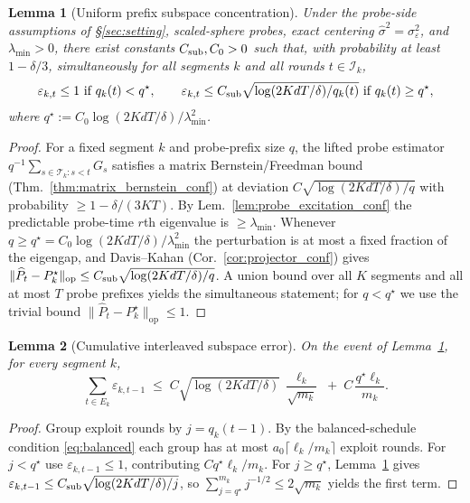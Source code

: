 \documentclass{article}
\newcommand{\op}{\mathrm{op}}
\newcommand{\cT}{\mathcal{T}}
\newcommand{\cI}{\mathcal{I}}
\newtheorem{lemma}{Lemma}
\begin{document}
\begin{lemma}[Uniform prefix subspace concentration]
\label{lem:prefix_subspace}
Under the probe-side assumptions of \S\ref{sec:setting}, scaled-sphere
probes, exact centering $\widehat\sigma^2=\sigma_\varepsilon^2$, and
$\lambda_{\min}>0$, there exist constants $C_{\rm sub},C_0>0$ such
that, with probability at least $1-\delta/3$, simultaneously for all
segments $k$ and all rounds $t\in\cI_k$,
\[
\varepsilon_{k,t}\le 1\text{ if }q_k(t)<q^\star,
\qquad
\varepsilon_{k,t}\le C_{\rm sub}\sqrt{\log(2KdT/\delta)/q_k(t)}
\text{ if }q_k(t)\ge q^\star,
\]
where $q^\star := C_0\log(2KdT/\delta)/\lambda_{\min}^2$.
\end{lemma}
\begin{proof}
For a fixed segment $k$ and probe-prefix size $q$, the lifted probe
estimator $q^{-1}\sum_{s\in\cT_k:s<t}G_s$ satisfies a matrix
Bernstein/Freedman bound (Thm.~\ref{thm:matrix_bernstein_conf}) at
deviation $C\sqrt{\log(2KdT/\delta)/q}$ with probability
$\ge 1-\delta/(3KT)$. By
Lem.~\ref{lem:probe_excitation_conf} the predictable probe-time
$r$th eigenvalue is $\ge\lambda_{\min}$. Whenever
$q\ge q^\star=C_0\log(2KdT/\delta)/\lambda_{\min}^2$ the perturbation
is at most a fixed fraction of the eigengap, and Davis--Kahan
(Cor.~\ref{cor:projector_conf}) gives
$\|\widehat P_t-P_k^\star\|_{\op}\le C_{\rm sub}\sqrt{\log(2KdT/\delta)/q}$.
A union bound over all $K$ segments and all at most $T$ probe
prefixes yields the simultaneous statement; for $q<q^\star$ we use
the trivial bound $\|\widehat P_t-P_k^\star\|_{\op}\le 1$.
\end{proof}

\begin{lemma}[Cumulative interleaved subspace error]
\label{lem:cumulative_interleaved_error}
On the event of Lemma~\ref{lem:prefix_subspace}, for every segment $k$,
\begin{equation}
\sum_{t\in E_k}\varepsilon_{k,t-1}
\;\le\;
C\sqrt{\log(2KdT/\delta)}\,\frac{\ell_k}{\sqrt{m_k}}
\;+\; C\,\frac{q^\star\ell_k}{m_k}.
\label{eq:cumul_eps}
\end{equation}
\end{lemma}
\begin{proof}
Group exploit rounds by $j=q_k(t-1)$. By the balanced-schedule
condition \eqref{eq:balanced} each group has at most
$a_0\lceil\ell_k/m_k\rceil$ exploit rounds. For $j<q^\star$ use
$\varepsilon_{k,t-1}\le 1$, contributing $C q^\star\ell_k/m_k$. For
$j\ge q^\star$, Lemma~\ref{lem:prefix_subspace} gives
$\varepsilon_{k,t-1}\le C_{\rm sub}\sqrt{\log(2KdT/\delta)/j}$, so
$\sum_{j=q^\star}^{m_k}j^{-1/2}\le 2\sqrt{m_k}$ yields the first term.
\end{proof}
\end{document}
